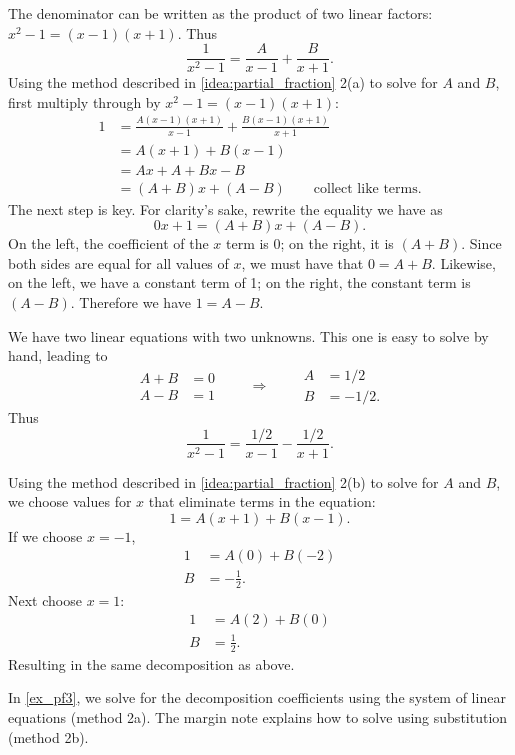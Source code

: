 {The denominator can be written as the product of two linear factors: $x^2-1 = (x-1)(x+1)$. Thus 
$$\frac{1}{x^2-1} = \frac{A}{x-1} + \frac{B}{x+1}.$$
Using the method described in \autoref{idea:partial_fraction} 2(a) to solve for $A$ and $B$, first multiply through by $x^2-1 = (x-1)(x+1)$:
\begin{align*}
	1
	&= \frac{A(x-1)(x+1)}{x-1}+\frac{B(x-1)(x+1)}{x+1} \\
	&= A(x+1) + B(x-1)\\
	&= Ax+A + Bx-B \\
	&= (A+B)x + (A-B)\qquad\text{collect like terms.}
\end{align*}
The next step is key. %
For clarity's sake, rewrite the equality we have as
$$0x+1 = (A+B)x+(A-B).$$
On the left, the coefficient of the $x$ term is 0; on the right, it is $(A+B)$. Since both sides are equal for all values of $x$, we must have that $0=A+B$. Likewise, on the left, we have a constant term of 1; on the right, the constant term is $(A-B)$. Therefore we have $1=A-B$.

We have two linear equations with two unknowns. This one is easy to solve by hand, leading to 
\[
 \begin{aligned}A+B&=0\\A-B&=1\end{aligned}
 \qquad\Rightarrow\qquad
 \begin{aligned}A&=1/2\\B&=-1/2.\end{aligned}
\]
Thus
\[\frac{1}{x^2-1}=\frac{1/2}{x-1}-\frac{1/2}{x+1}.\]

Using the method described in \autoref{idea:partial_fraction} 2(b) to solve for $A$ and $B$, we choose values for $x$ that eliminate terms in the equation:
\[1=A(x+1) + B(x-1).\]
If we choose $x=-1$,
\begin{align*}
 1&=A(0) + B(-2) \\
 B&=-\frac{1}{2}.
\end{align*}
Next choose $x=1$:
\begin{align*}
 1&=A(2) + B(0) \\
 B&=\frac{1}{2}.
\end{align*}
Resulting in the same decomposition as above.}

In \autoref{ex_pf3}, we solve for the decomposition coefficients using the system of linear equations (method 2a). The margin note explains how to solve using substitution (method 2b).

